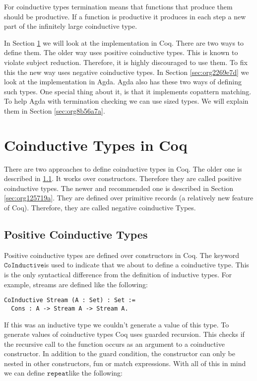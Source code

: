 \documentclass[a4paper,cleardoubleempty,BCOR1cm]{scrbook}
\begin{document}
For coinductive types termination means that functions that produce them
should be productive. If a function is productive it produces in each step a
new part of the infinitely large coinductive type.

In Section \ref{sec:org8a29882} we will look at the implementation in Coq.
There are two ways to define them. The older way uses positive coinductive
types. This is known to violate subject reduction. Therefore, it is highly
discouraged to use them. To fix this the new way uses negative coinductive
types. In Section \ref{sec:org2269e7d} we look at the implementation in
Agda. Agda also has these two ways of defining such types. One special thing
about it, is that it implements copattern matching. To help Agda with
termination checking we can use sized types.  We will explain them in Section
\ref{sec:org8b56a7a}.
\section{Coinductive Types in Coq}
\label{sec:org8a29882}
There are two approaches to define coinductive types in Coq. The older one is
described in \ref{sec:org5338dda}. It works over constructors. Therefore
they are called positive coinductive types. The newer and recommended one is
described in Section \ref{sec:org125719a}. They are defined over
primitive records (a relatively new feature of Coq). Therefore, they are
called negative coinductive Types.

\subsection{Positive Coinductive Types}
\label{sec:org5338dda}
Positive coinductive types are defined over constructors in Coq.  The keyword
\linebreak $\mathtt{CoInductive}$\;is used to indicate that we about to define a coinductive type.
This is the only syntactical difference from the definition of inductive
types. For example, streams are defined like the following:

\begin{verbatim}
CoInductive Stream (A : Set) : Set :=
  Cons : A -> Stream A -> Stream A.
\end{verbatim}

If this was an inductive type we couldn't generate a value of this type. To
generate values of coinductive types Coq uses guarded recursion. This checks
if the recursive call to the function occurs as an argument to a coinductive
constructor. In addition to the guard condition, the constructor can only be
nested in other constructors, fun or match expressions. With all of this in
mind we can define $\mathtt{repeat}$\;like the following:
\end{document}
